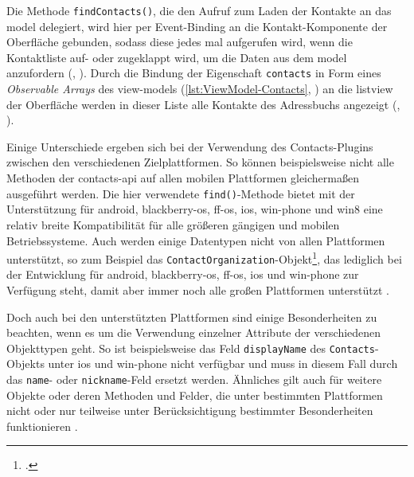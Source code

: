 
Die Methode \lstinline|findContacts()|, die den Aufruf zum Laden der Kontakte an das \gls{model} delegiert, wird hier per Event-Binding an die Kontakt-Komponente der Oberfläche gebunden, sodass diese jedes mal aufgerufen wird, wenn die Kontaktliste auf- oder zugeklappt wird, um die Daten aus dem \gls{model} anzufordern (, ).
Durch die Bindung der Eigenschaft \lstinline|contacts| in Form eines \emph{Observable Arrays} des \glspl{view-model} (\autoref{lst:ViewModel-Contacts}, ) an die \gls{listview} der Oberfläche werden in dieser Liste alle Kontakte des Adressbuchs angezeigt (, ).

	
		
Einige Unterschiede ergeben sich bei der Verwendung des Contacts-Plugins zwischen den verschiedenen Zielplattformen.
So können beispielsweise nicht alle Methoden der contacts-\gls{api} auf allen mobilen Plattformen gleichermaßen ausgeführt werden.
Die hier verwendete \lstinline|find()|-Methode bietet mit der Unterstützung für \gls{android}, \gls{blackberry-os}, \gls{ff-os}, \gls{ios}, \gls{win-phone} und \gls{win8} eine relativ  breite Kompatibilität für alle größeren gängigen und mobilen Betriebssysteme.
Auch werden einige Datentypen nicht von allen Plattformen unterstützt, so zum Beispiel das \lstinline|ContactOrganization|-Objekt\footnote{.}, das lediglich bei der Entwicklung für \gls{android}, \gls{blackberry-os}, \gls{ff-os}, \gls{ios} und \gls{win-phone} zur Verfügung steht, damit aber immer noch alle großen Plattformen unterstützt \cite{Cordova_Plugin_Registry_Contacts}.

Doch auch bei den unterstützten Plattformen sind einige Besonderheiten zu beachten, wenn es um die Verwendung einzelner Attribute der verschiedenen Objekttypen geht.
So ist beispielsweise das Feld \lstinline|displayName| des \lstinline|Contacts|-Objekts unter \gls{ios} und \gls{win-phone} nicht verfügbar und muss in diesem Fall durch das \lstinline|name|- oder \lstinline|nickname|-Feld ersetzt werden. %
Ähnliches gilt auch für weitere Objekte oder deren Methoden und Felder, die unter bestimmten Plattformen nicht oder nur teilweise unter Berücksichtigung bestimmter Besonderheiten funktionieren \cite{Cordova_Plugin_Registry_Contacts}.

